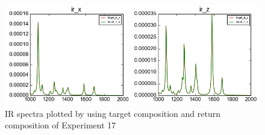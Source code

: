 




\begin{figure}[!ht] \label{fig:4.2}
\centering
\includegraphics[scale=0.5]{Figures/chapter4_result_target_plotting_5datapoint_ir.png}
\caption{IR spectra plotted by using target composition and return composition of Experiment 17} 
\end{figure}


